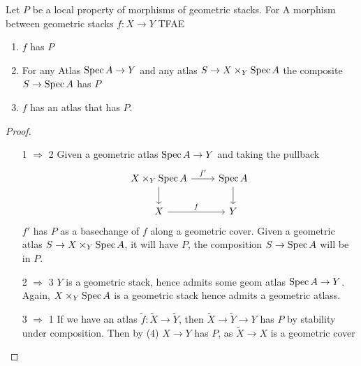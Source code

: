 \begin{lemma}{\label{lemma:atlasOfMap}}
	Let $P$ be a local property of morphisms of geometric stacks. For
	A morphism between geometric stacks $f : X \to Y$  TFAE 
	\begin{enumerate}
		\item $f$ has $P$
		
		\item For any Atlas $\operatorname{Spec} A \to Y$ and any atlas $S \to X \times_Y \operatorname{Spec} A$ the composite $S \to \operatorname{Spec} A$ has $P$
		\item $f$ has an atlas that has $P$.
	\end{enumerate}
\end{lemma}
\begin{proof}
	\begin{itemize}
		\item [1 $\Rightarrow$ 2]
		Given a geometric atlas $\operatorname{Spec} A \to Y$ and taking the pullback %
		\[\begin{tikzcd}
			{X \times_Y \Spec A} & {\Spec A} \\
			X & Y
			\arrow["{f'}", from=1-1, to=1-2]
			\arrow[from=1-1, to=2-1]
			\arrow[from=1-2, to=2-2]
			\arrow["f", from=2-1, to=2-2]
		\end{tikzcd}\]
		$f'$ has $P$ as a basechange of $f$ along a geometric cover. Given a geometric atlas $S \to X \times_Y \operatorname{Spec} A$, it will have $P$, the composition $S \to \operatorname{Spec} A$ will be in $P$.
		\item [2 $\Rightarrow$ 3]
		$Y$ is a geometric stack, hence admits some geom atlas $\operatorname{Spec} A \to Y$. Again, $X \times_Y \operatorname{Spec} A$ is a geometric stack hence admits a geometric atlass.
		\item [3 $\Rightarrow$ 1]
		If we have an atlas $\tilde f : \tilde X \to \tilde Y$, then $\tilde X \to \tilde Y \to Y$ has $P$ by stability under composition. Then by (4) $X \to Y$ has $P$, as $\tilde X \to X$ is a geometric cover \\
		
	\end{itemize}
\end{proof}

